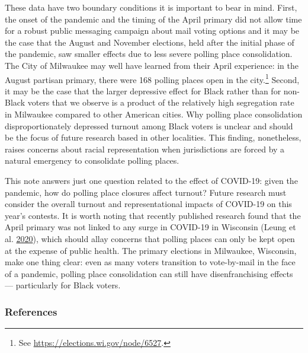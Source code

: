 \documentclass[
  12pt,
]{article}
\begin{document}
These data have two boundary conditions it is important to bear in mind. First, the onset of the pandemic and the timing of the April primary did not allow time for a robust public messaging campaign about mail voting options and it may be the case that the August and November elections, held after the initial phase of the pandemic, saw smaller effects due to less severe polling place consolidation. The City of Milwaukee may well have learned from their April experience: in the August partisan primary, there were 168 polling places open in the city.\footnote{See \url{https://elections.wi.gov/node/6527}.} Second, it may be the case that the larger depressive effect for Black rather than for non-Black voters that we observe is a product of the relatively high segregation rate in Milwaukee compared to other American cities. Why polling place consolidation disproportionately depressed turnout among Black voters is unclear and should be the focus of future research based in other localities. This finding, nonetheless, raises concerns about racial representation when jurisdictions are forced by a natural emergency to consolidate polling places.

This note answers just one question related to the effect of COVID-19: given the pandemic, how do polling place closures affect turnout? Future research must consider the overall turnout and representational impacts of COVID-19 on this year's contests. It is worth noting that recently published research found that the April primary was not linked to any surge in COVID-19 in Wisconsin (Leung et al. \protect\hyperlink{ref-Leung2020}{2020}), which should allay concerns that polling places can only be kept open at the expense of public health. The primary elections in Milwaukee, Wisconsin, make one thing clear: even as many voters transition to vote-by-mail in the face of a pandemic, polling place consolidation can still have disenfranchising effects --- particularly for Black voters.

\newpage

\hypertarget{references}{%
\subsubsection*{References}\label{references}}
\end{document}

